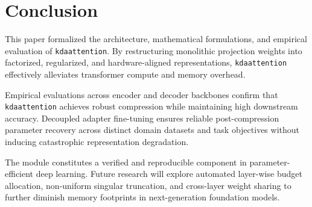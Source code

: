 \section{Conclusion}
This paper formalized the architecture, mathematical formulations, and empirical evaluation of \texttt{kdaattention}. By restructuring monolithic projection weights into factorized, regularized, and hardware-aligned representations, \texttt{kdaattention} effectively alleviates transformer compute and memory overhead.

Empirical evaluations across encoder and decoder backbones confirm that \texttt{kdaattention} achieves robust compression while maintaining high downstream accuracy. Decoupled adapter fine-tuning ensures reliable post-compression parameter recovery across distinct domain datasets and task objectives without inducing catastrophic representation degradation.

The module constitutes a verified and reproducible component in parameter-efficient deep learning. Future research will explore automated layer-wise budget allocation, non-uniform singular truncation, and cross-layer weight sharing to further diminish memory footprints in next-generation foundation models.
